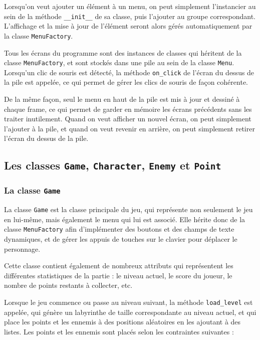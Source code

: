 \documentclass[12pt]{scrreprt} %
\begin{document}
Lorsqu'on veut ajouter un élément à un menu, on peut simplement l'instancier au sein de la méthode \texttt{\_\_init\_\_} de sa classe, puis l'ajouter au groupe correspondant. L'affichage et la mise à jour de l'élément seront alors gérés automatiquement par la classe \texttt{MenuFactory}.

Tous les écrans du programme sont des instances de classes qui héritent de la classe \texttt{MenuFactory}, et sont stockés dans une pile au sein de la classe \texttt{Menu}. Lorsqu'un clic de souris est détecté, la méthode \texttt{on\_click} de l'écran du dessus de la pile est appelée, ce qui permet de gérer les clics de souris de façon cohérente.

De la même façon, seul le menu en haut de la pile est mis à jour et dessiné à chaque frame, ce qui permet de garder en mémoire les écrans précédents sans les traiter inutilement. Quand on veut afficher un nouvel écran, on peut simplement l'ajouter à la pile, et quand on veut revenir en arrière, on peut simplement retirer l'écran du dessus de la pile.

\subsection{Les classes \texttt{Game}, \texttt{Character}, \texttt{Enemy} et \texttt{Point}}

\subsubsection{La classe \texttt{Game}}

La classe \texttt{Game} est la classe principale du jeu, qui représente non seulement le jeu en lui-même, mais également le menu qui lui est associé. Elle hérite donc de la classe \texttt{MenuFactory} afin d'implémenter des boutons et des champs de texte dynamiques, et de gérer les appuis de touches sur le clavier pour déplacer le personnage.

Cette classe contient également de nombreux attributs qui représentent les différentes statistiques de la partie : le niveau actuel, le score du joueur, le nombre de points restants à collecter, etc.

Lorsque le jeu commence ou passe au niveau suivant, la méthode \texttt{load\_level} est appelée, qui génère un labyrinthe de taille correspondante au niveau actuel, et qui place les points et les ennemis à des positions aléatoires en les ajoutant à des listes. Les points et les ennemis sont placés selon les contraintes suivantes :
\end{document}
